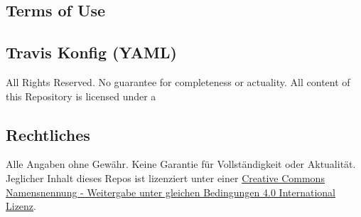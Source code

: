 \documentclass[]{article}
\begin{document}
\subsection{Terms of Use}\label{terms-of-use}
\subsection{Travis Konfig (YAML)}\label{travis-konfig-yaml}




All Rights Reserved. No guarantee for completeness or actuality. All
content of this Repository is licensed under a
\subsection{Rechtliches}\label{rechtliches}

Alle Angaben ohne Gewähr. Keine Garantie für Vollständigkeit oder
Aktualität. Jeglicher Inhalt dieses Repos ist lizenziert unter einer
\href{http://creativecommons.org/licenses/by-sa/4.0/}{Creative Commons
Namensnennung - Weitergabe unter gleichen Bedingungen 4.0 International
Lizenz}.
\end{document}
